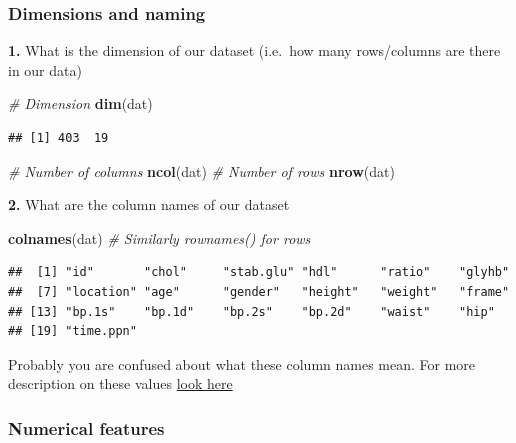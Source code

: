 \documentclass[
]{book}
\newenvironment{Shaded}{\begin{snugshade}}{\end{snugshade}}
\newcommand{\CommentTok}[1]{\textcolor[rgb]{0.56,0.35,0.01}{\textit{#1}}}
\newcommand{\FunctionTok}[1]{\textcolor[rgb]{0.13,0.29,0.53}{\textbf{#1}}}
\newcommand{\NormalTok}[1]{#1}
\begin{document}
\hypertarget{dimensions-and-naming}{%
\subsubsection{Dimensions and naming}\label{dimensions-and-naming}}

\textbf{1.} What is the dimension of our dataset (i.e.~how many rows/columns are there in our data)

\begin{Shaded}
\begin{Highlighting}[]
\CommentTok{\# Dimension}
\FunctionTok{dim}\NormalTok{(dat)}
\end{Highlighting}
\end{Shaded}

\begin{verbatim}
## [1] 403  19
\end{verbatim}

\begin{Shaded}
\begin{Highlighting}[]
\CommentTok{\# Number of columns}
\FunctionTok{ncol}\NormalTok{(dat)}
\CommentTok{\# Number of rows}
\FunctionTok{nrow}\NormalTok{(dat)}
\end{Highlighting}
\end{Shaded}

\textbf{2.} What are the column names of our dataset

\begin{Shaded}
\begin{Highlighting}[]
\FunctionTok{colnames}\NormalTok{(dat) }\CommentTok{\# Similarly rownames() for rows}
\end{Highlighting}
\end{Shaded}

\begin{verbatim}
##  [1] "id"       "chol"     "stab.glu" "hdl"      "ratio"    "glyhb"   
##  [7] "location" "age"      "gender"   "height"   "weight"   "frame"   
## [13] "bp.1s"    "bp.1d"    "bp.2s"    "bp.2d"    "waist"    "hip"     
## [19] "time.ppn"
\end{verbatim}

Probably you are confused about what these column names mean.
For more description on these values \href{https://biostat.app.vumc.org/wiki/pub/Main/DataSets/Cdiabetes.html}{look here}

\hypertarget{numerical-features}{%
\subsubsection{Numerical features}\label{numerical-features}}
\end{document}
